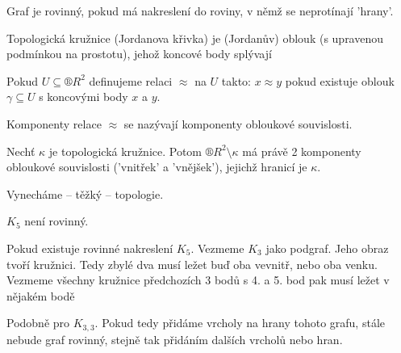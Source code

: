 \documentclass[12pt]{article}					%
\begin{document}
    \begin{definice}
        Graf je rovinný, pokud má nakreslení do roviny, v němž se neprotínají 'hrany'.
    \end{definice}

    \begin{definice}
        Topologická kružnice (Jordanova křivka) je (Jordanův) oblouk (s upravenou podmínkou na prostotu), jehož koncové body splývají
    \end{definice}

    \begin{definice}
        Pokud $U \subseteq ®R^2$ definujeme relaci $\approx$ na $U$ takto: $x \approx y$ pokud existuje oblouk $\gamma \subseteq U$ s koncovými body $x$ a $y$.
    \end{definice}

    \begin{definice}
        Komponenty relace $\approx$ se nazývají komponenty obloukové souvislosti.
    \end{definice}

    \begin{veta}
        Nechť $\kappa$ je topologická kružnice. Potom $®R^2 \setminus \kappa$ má právě 2 komponenty obloukové souvislosti ('vnitřek' a 'vnějšek'), jejichž hranicí je $\kappa$.

        \begin{dukazin}
            Vynecháme -- těžký -- topologie.
        \end{dukazin}
    \end{veta}

    \begin{tvrzeni}
        $K_5$ není rovinný.

        \begin{dukazin}
            Pokud existuje rovinné nakreslení $K_5$. Vezmeme $K_3$ jako podgraf. Jeho obraz tvoří kružnici. Tedy zbylé dva musí ležet buď oba vevnitř, nebo oba venku. Vezmeme všechny kružnice předchozích 3 bodů s 4. a 5. bod pak musí ležet v nějakém bodě
        \end{dukazin}
    \end{tvrzeni}

    \begin{poznamka}
        Podobně pro $K_{3, 3}$. Pokud tedy přidáme vrcholy na hrany tohoto grafu, stále nebude graf rovinný, stejně tak přidáním dalších vrcholů nebo hran.
    \end{poznamka}
\end{document}
